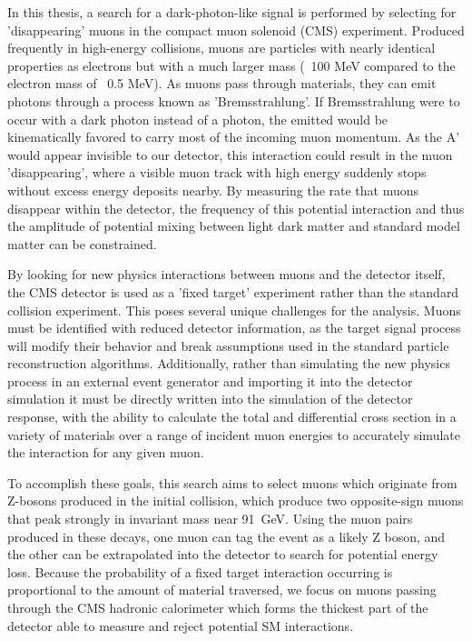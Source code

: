 In this thesis, a search for a dark-photon-like signal is performed by selecting for 'disappearing' muons in the compact muon solenoid (CMS) experiment. 
Produced frequently in high-energy collisions, muons are particles with nearly identical properties as electrons but with a much larger mass (~100 MeV compared to the electron mass of ~0.5 MeV).
As muons pass through materials, they can emit photons through a process known as 'Bremsstrahlung'. 
If Bremsstrahlung were to occur with a dark photon instead of a photon, the emitted \aprime would be kinematically favored to carry most of the incoming muon momentum.
As the A' would appear invisible to our detector, this interaction could result in the muon 'disappearing', where a visible muon track with high energy suddenly stops without excess energy deposits nearby.
By measuring the rate that muons disappear within the detector, the frequency of this potential interaction and thus the amplitude of potential mixing between light dark matter and standard model matter can be constrained.

By looking for new physics interactions between muons and the detector itself, the CMS detector is used as a 'fixed target' experiment rather than the standard collision experiment.
This poses several unique challenges for the analysis.
Muons must be identified with reduced detector information, as the target signal process will modify their behavior and break assumptions used in the standard particle reconstruction algorithms.
Additionally, rather than simulating the new physics process in an external event generator and importing it into the detector simulation it must be directly written into the simulation of the detector response, with the ability to calculate the total and differential cross section in a variety of materials over a range of incident muon energies to accurately simulate the interaction for any given muon.

To accomplish these goals, this search aims to select muons which originate from Z-bosons produced in the initial collision, which produce two opposite-sign muons that peak strongly in invariant mass near \SI{91}{\giga\eV}.
Using the muon pairs produced in these decays, one muon can tag the event as a likely Z boson, and the other can be extrapolated into the detector to search for potential energy loss.
Because the probability of a fixed target interaction occurring is proportional to the amount of material traversed, we focus on muons passing through the CMS hadronic calorimeter which forms the thickest part of the detector able to measure and reject potential SM interactions.

